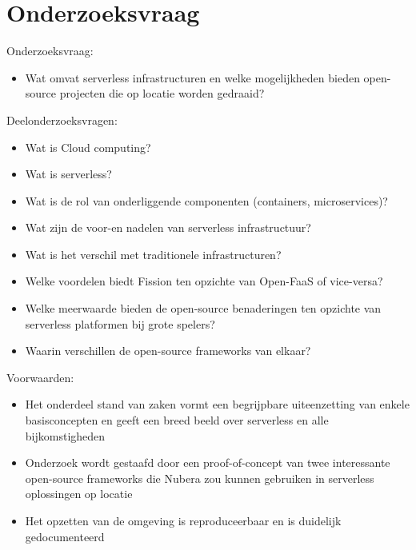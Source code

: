 \section{Onderzoeksvraag}
\label{sec:onderzoeksvraag}


Onderzoeksvraag: 
\begin{itemize}
    \item Wat omvat serverless infrastructuren en welke mogelijkheden bieden open-source projecten die op locatie worden gedraaid?
\end{itemize}

Deelonderzoeksvragen: 
\begin{itemize}
    \item Wat is Cloud computing?
    \item Wat is serverless?
    \item Wat is de rol van onderliggende componenten (containers, microservices)?
    \item Wat zijn de voor-en nadelen van serverless infrastructuur?
    \item Wat is het verschil met traditionele infrastructuren?
    \item Welke voordelen biedt Fission ten opzichte van Open-FaaS of vice-versa?
    \item Welke meerwaarde bieden de open-source benaderingen ten opzichte van serverless platformen bij grote spelers?
    \item Waarin verschillen de open-source frameworks van elkaar?
\end{itemize}

Voorwaarden: 
\begin{itemize}
    \item Het onderdeel stand van zaken vormt een begrijpbare uiteenzetting van enkele basisconcepten en geeft een breed beeld over serverless en alle bijkomstigheden
    \item Onderzoek wordt gestaafd door een proof-of-concept van  twee interessante open-source frameworks die  Nubera zou kunnen gebruiken in serverless oplossingen op locatie
    \item Het opzetten van de omgeving is reproduceerbaar en is duidelijk gedocumenteerd
\end{itemize}



